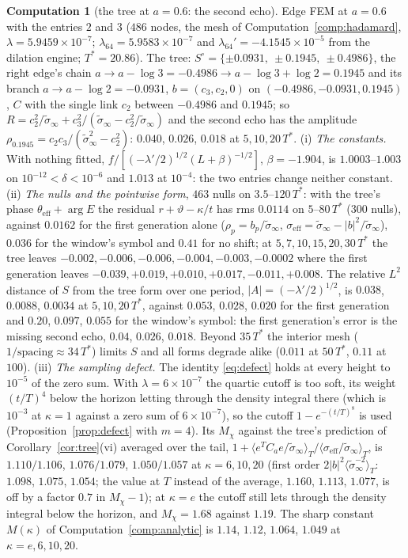 \documentclass[11pt]{article}
\theoremstyle{definition}
\newtheorem{computation}[theorem]{Computation}
\theoremstyle{remark}
\newcommand{\Tst}{T^{*}}
\begin{document}
\begin{computation}[the tree at $a=0.6$: the second echo]\label{comp:tree06}
Edge FEM at $a=0.6$ with the entries $2$ and $3$ ($486$ nodes, the mesh of Computation~\ref{comp:hadamard}, $\lambda=5.9459\times10^{-7}$; $\lambda_{64}=5.9583\times10^{-7}$ and $\lambda_{64}'=-4.1545\times10^{-5}$ from the dilation engine; $\Tst=20.86$). The tree: $S^\circ=\{\pm0.0931,\ \pm0.1945,\ \pm0.4986\}$, the right edge's chain $a\to a-\log3=-0.4986\to a-\log3+\log2=0.1945$ and its branch $a\to a-\log2=-0.0931$, $b=(c_3,c_2,0)$ on $(-0.4986,-0.0931,0.1945)$, $C$ with the single link $c_2$ between $-0.4986$ and $0.1945$; so $R=c_2^2/\tilde\sigma_\infty+c_3^2/(\tilde\sigma_\infty-c_2^2/\tilde\sigma_\infty)$ and the second echo has the amplitude $\rho_{0.1945}=c_2c_3/(\tilde\sigma_\infty^2-c_2^2)$: $0.040$, $0.026$, $0.018$ at $5,10,20\,\Tst$. (i) \emph{The constants.} With nothing fitted, $f/[(-\lambda'/2)^{1/2}(L+\beta)^{-1/2}]$, $\beta=-1.904$, is $1.0003$--$1.003$ on $10^{-12}<\delta<10^{-6}$ and $1.013$ at $10^{-4}$: the two entries change neither constant. (ii) \emph{The nulls and the pointwise form}, $463$ nulls on $3.5$--$120\,\Tst$: with the tree's phase $\theta_{\mathrm{eff}}+\arg E$ the residual $r+\vartheta-\kappa/t$ has rms $0.0114$ on $5$--$80\,\Tst$ ($300$ nulls), against $0.0162$ for the first generation alone ($\rho_p=b_p/\tilde\sigma_\infty$, $\sigma_{\mathrm{eff}}=\tilde\sigma_\infty-|b|^2/\tilde\sigma_\infty$), $0.036$ for the window's symbol and $0.41$ for no shift; at $5,7,10,15,20,30\,\Tst$ the tree leaves $-0.002,-0.006,-0.006,-0.004,-0.003,-0.0002$ where the first generation leaves $-0.039,+0.019,+0.010,+0.017,-0.011,+0.008$. The relative $L^2$ distance of $S$ from the tree form over one period, $|A|=(-\lambda'/2)^{1/2}$, is $0.038$, $0.0088$, $0.0034$ at $5,10,20\,\Tst$, against $0.053$, $0.028$, $0.020$ for the first generation and $0.20$, $0.097$, $0.055$ for the window's symbol: the first generation's error is the missing second echo, $0.04$, $0.026$, $0.018$. Beyond $35\,\Tst$ the interior mesh ($1/\text{spacing}\approx34\,\Tst$) limits $S$ and all forms degrade alike ($0.011$ at $50\,\Tst$, $0.11$ at $100$). (iii) \emph{The sampling defect.} The identity \eqref{eq:defect} holds at every height to $10^{-5}$ of the zero sum. With $\lambda=6\times10^{-7}$ the quartic cutoff is too soft, its weight $(t/T)^4$ below the horizon letting through the density integral there (which is $10^{-3}$ at $\kappa=1$ against a zero sum of $6\times10^{-7}$), so the cutoff $1-e^{-(t/T)^8}$ is used (Proposition~\ref{prop:defect} with $m=4$). Its $M_\chi$ against the tree's prediction of Corollary~\ref{cor:tree}(vi) averaged over the tail, $1+\langle e^TC_ae/\tilde\sigma_\infty\rangle_T/\langle\sigma_{\mathrm{eff}}/\tilde\sigma_\infty\rangle_T$, is $1.110/1.106$, $1.076/1.079$, $1.050/1.057$ at $\kappa=6,10,20$ (first order $2|b|^2\langle\tilde\sigma_\infty^{-2}\rangle_T$: $1.098$, $1.075$, $1.054$; the value at $T$ instead of the average, $1.160$, $1.113$, $1.077$, is off by a factor $0.7$ in $M_\chi-1$); at $\kappa=e$ the cutoff still lets through the density integral below the horizon, and $M_\chi=1.68$ against $1.19$. The sharp constant $M(\kappa)$ of Computation~\ref{comp:analytic} is $1.14$, $1.12$, $1.064$, $1.049$ at $\kappa=e,6,10,20$.

\end{computation}
\end{document}
